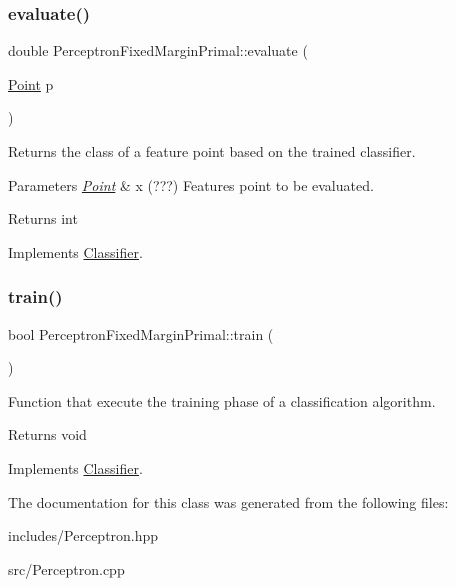 \subsubsection{\texorpdfstring{evaluate()}{evaluate()}}
{\footnotesize\ttfamily double Perceptron\+Fixed\+Margin\+Primal\+::evaluate (\begin{DoxyParamCaption}\item[{\hyperlink{class_point}{Point}}]{p }\end{DoxyParamCaption})\hspace{0.3cm}{\ttfamily [virtual]}}



Returns the class of a feature point based on the trained classifier. 


\begin{DoxyParams}{Parameters}
{\em \hyperlink{class_point}{Point}} & x (???) Features point to be evaluated. \\
\hline
\end{DoxyParams}
\begin{DoxyReturn}{Returns}
int 
\end{DoxyReturn}


Implements \hyperlink{class_classifier_ae8e9554823b85ddc2dcad2955da811d9}{Classifier}.

\mbox{\label{class_perceptron_fixed_margin_primal_ad41c2a42c4a819c03bf9879110b0f99f}} 
\subsubsection{\texorpdfstring{train()}{train()}}
{\footnotesize\ttfamily bool Perceptron\+Fixed\+Margin\+Primal\+::train (\begin{DoxyParamCaption}{ }\end{DoxyParamCaption})\hspace{0.3cm}{\ttfamily [virtual]}}



Function that execute the training phase of a classification algorithm. 

\begin{DoxyReturn}{Returns}
void 
\end{DoxyReturn}


Implements \hyperlink{class_classifier_a2306a5de27555ab093593ac9642bc7d9}{Classifier}.



The documentation for this class was generated from the following files\+:\begin{DoxyCompactItemize}
\item 
includes/Perceptron.\+hpp\item 
src/Perceptron.\+cpp\end{DoxyCompactItemize}
